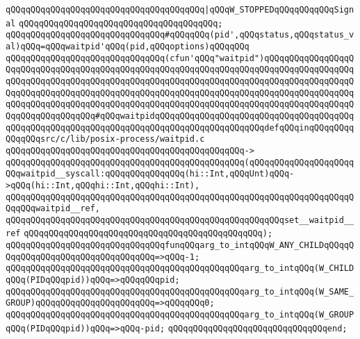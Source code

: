 \verb|qQQqqQQqqQQqqQQqqQQqqQQqqQQqqQQqqQQqqQQq|\verb#|qQQqW_STOPPEDqQQqqQQqqQQqSignal#\newline
\verb|qQQqqQQqqQQqqQQqqQQqqQQqqQQqqQQqqQQqqQQq;|\newline
\newline
\verb|qQQqqQQqqQQqqQQqqQQqqQQqqQQqqQQq#qQQqqQQq(pid',qQQqstatus,qQQqstatus_val)qQQq=qQQqwaitpid'qQQq(pid,qQQqoptions)qQQqqQQq|\newline
\newline
\verb|qQQqqQQqqQQqqQQqqQQqqQQqqQQqqQQq(cfun'qQQq"waitpid")qQQqqQQqqQQqqQQqqQQqqQQqqQQqqQQqqQQqqQQqqQQqqQQqqQQqqQQqqQQqqQQqqQQqqQQqqQQqqQQqqQQqqQQqqQQqqQQqqQQqqQQqqQQqqQQqqQQqqQQqqQQqqQQqqQQqqQQqqQQqqQQqqQQqqQQqqQQqqQQqqQQqqQQqqQQqqQQqqQQqqQQqqQQqqQQqqQQqqQQqqQQqqQQqqQQqqQQqqQQqqQQqqQQqqQQqqQQqqQQqqQQqqQQqqQQqqQQqqQQqqQQqqQQqqQQqqQQqqQQqqQQqqQQqqQQqqQQqqQQqqQQqqQQqqQQqqQQq#qQQqwaitpidqQQqqQQqqQQqqQQqqQQqqQQqqQQqqQQqqQQqqQQqqQQqqQQqqQQqqQQqqQQqqQQqqQQqqQQqqQQqqQQqqQQqqQQqqQQqdefqQQqinqQQqqQQqqQQqqQQqsrc/c/lib/posix-process/waitpid.c|\newline
\verb|qQQqqQQqqQQqqQQqqQQqqQQqqQQqqQQqqQQqqQQqqQQqqQQq->|\newline
\verb|qQQqqQQqqQQqqQQqqQQqqQQqqQQqqQQqqQQqqQQqqQQqqQQq(qQQqqQQqqQQqqQQqqQQqqQQqwaitpid__syscall:qQQqqQQqqQQqqQQq(hi::Int,qQQqUnt)qQQq->qQQq(hi::Int,qQQqhi::Int,qQQqhi::Int),|\newline
\verb|qQQqqQQqqQQqqQQqqQQqqQQqqQQqqQQqqQQqqQQqqQQqqQQqqQQqqQQqqQQqqQQqqQQqqQQqqQQqwaitpid__ref,|\newline
\verb|qQQqqQQqqQQqqQQqqQQqqQQqqQQqqQQqqQQqqQQqqQQqqQQqqQQqqQQqset__waitpid__ref|\newline
\verb|qQQqqQQqqQQqqQQqqQQqqQQqqQQqqQQqqQQqqQQqqQQqqQQq);|\newline
\newline
\newline
\verb|qQQqqQQqqQQqqQQqqQQqqQQqqQQqqQQqfunqQQqarg_to_intqQQqW_ANY_CHILDqQQqqQQqqQQqqQQqqQQqqQQqqQQqqQQqqQQq=>qQQq-1;|\newline
\verb|qQQqqQQqqQQqqQQqqQQqqQQqqQQqqQQqqQQqqQQqqQQqqQQqarg_to_intqQQq(W_CHILDqQQq(PIDqQQqpid))qQQq=>qQQqqQQqpid;|\newline
\verb|qQQqqQQqqQQqqQQqqQQqqQQqqQQqqQQqqQQqqQQqqQQqqQQqarg_to_intqQQq(W_SAME_GROUP)qQQqqQQqqQQqqQQqqQQqqQQq=>qQQqqQQq0;|\newline
\verb|qQQqqQQqqQQqqQQqqQQqqQQqqQQqqQQqqQQqqQQqqQQqqQQqarg_to_intqQQq(W_GROUPqQQq(PIDqQQqpid))qQQq=>qQQq-pid;|\newline
\verb|qQQqqQQqqQQqqQQqqQQqqQQqqQQqqQQqend;|\newline
